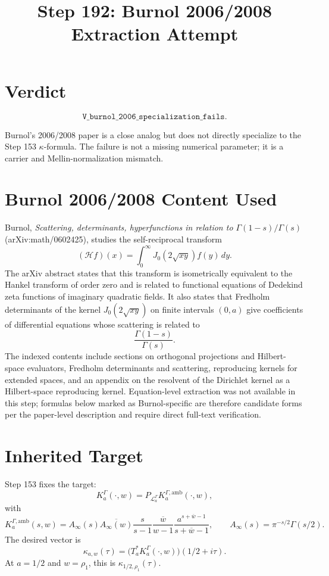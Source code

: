 \documentclass[11pt]{article}
\title{Step 192: Burnol 2006/2008 Extraction Attempt}
\date{}
\newcommand{\KG}{K_a^\Gamma}
\newcommand{\Kamb}{K_a^{\Gamma,\mathrm{amb}}}
\newcommand{\PL}{P_{\mathcal L_a^\Gamma}}
\newcommand{\Ainf}{A_\infty}
\newcommand{\kappaone}{\kappa_{1/2,\rho_1}}
\begin{document}
\maketitle

\section*{Verdict}

\[
\boxed{\texttt{V\_burnol\_2006\_specialization\_fails}}.
\]

Burnol's 2006/2008 paper is a close analog but does not directly specialize to the Step 153 \(\kappa\)-formula.  The failure is not a missing numerical parameter; it is a carrier and Mellin-normalization mismatch.

\section*{Burnol 2006/2008 Content Used}

Burnol, \emph{Scattering, determinants, hyperfunctions in relation to \(\Gamma(1-s)/\Gamma(s)\)} (arXiv:math/0602425), studies the self-reciprocal transform
\[
(\mathcal H f)(x)=\int_0^\infty J_0(2\sqrt{xy})f(y)\,dy.
\]
The arXiv abstract states that this transform is isometrically equivalent to the Hankel transform of order zero and is related to functional equations of Dedekind zeta functions of imaginary quadratic fields.  It also states that Fredholm determinants of the kernel \(J_0(2\sqrt{xy})\) on finite intervals \((0,a)\) give coefficients of differential equations whose scattering is related to
\[
\frac{\Gamma(1-s)}{\Gamma(s)}.
\]
The indexed contents include sections on orthogonal projections and Hilbert-space evaluators, Fredholm determinants and scattering, reproducing kernels for extended spaces, and an appendix on the resolvent of the Dirichlet kernel as a Hilbert-space reproducing kernel.  Equation-level extraction was not available in this step; formulas below marked as Burnol-specific are therefore candidate forms per the paper-level description and require direct full-text verification.

\section*{Inherited Target}

Step 153 fixes the target:
\[
\KG(\cdot,w)=\PL\Kamb(\cdot,w),
\]
with
\[
\Kamb(s,w)=
\Ainf(s)\overline{\Ainf(w)}
\frac{s}{s-1}\overline{\frac{w}{w-1}}
\frac{a^{s+\overline w-1}}{s+\overline w-1},
\qquad
\Ainf(s)=\pi^{-s/2}\Gamma(s/2).
\]
The desired vector is
\[
\kappa_{a,w}(\tau)
=
\bigl(T_a^*\KG(\cdot,w)\bigr)(1/2+i\tau).
\]
At \(a=1/2\) and \(w=\rho_1\), this is \(\kappaone(\tau)\).
\end{document}
